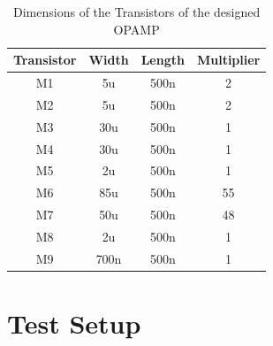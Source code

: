 \begin{table} [H]
\centering
\begin{tabular}{@{}cccc@{}}
\toprule
Transistor			& Width				& Length			& Multiplier \\ \midrule
M1					& 5u				& 500n				& 2			\\
M2					& 5u				& 500n				& 2			\\ 
M3					& 30u				& 500n				& 1			\\
M4					& 30u				& 500n				& 1			\\ 
M5					& 2u				& 500n				& 1			\\
M6					& 85u				& 500n				& 55		\\ 
M7					& 50u				& 500n				& 48		\\
M8					& 2u				& 500n				& 1			\\ 
M9					& 700n				& 500n				& 1			\\
\bottomrule
\end{tabular}
\caption{Dimensions of the Transistors of the designed OPAMP}
\label{tab:OPAMP_dimensions}
\end{table}

\section{Test Setup}

